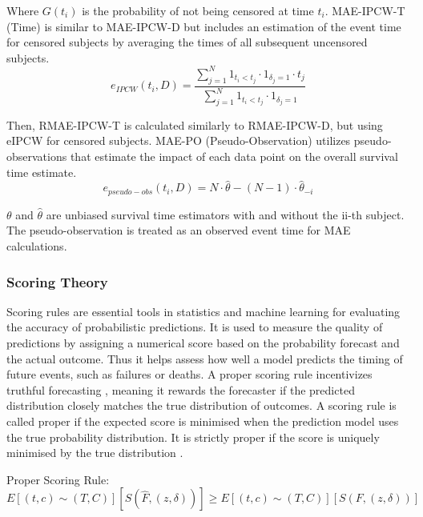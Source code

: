 \noindent Where \(G(t_{i})\) is the probability of not being censored at time \(t_{i}\). MAE-IPCW-T (Time) is similar to MAE-IPCW-D but includes an estimation of the event time for censored subjects by averaging the times of all subsequent uncensored subjects.
\begin{equation} \label{eq:maeipcw}e_{IPCW}(t_i, D) = \frac{\sum_{j=1}^N 1_{t_i<t_j} \cdot 1_{\delta_j=1} \cdot t_j}{\sum_{j=1}^N 1_{t_i<t_j} \cdot 1_{\delta_j=1}}\end{equation}
\par \noindent Then, RMAE-IPCW-T is calculated similarly to RMAE-IPCW-D, but using eIPCW  for censored subjects. MAE-PO (Pseudo-Observation) utilizes pseudo-observations that estimate the impact of each data point on the overall survival time estimate. 
\begin{equation} \label{eq:maepsuedo}e_{pseudo-obs}(t_i, D) = N \cdot \hat{\theta} - (N - 1) \cdot \hat{\theta}_{-i}\end{equation}
\par \noindent \(\theta\) and \(\hat{\theta}\) are unbiased survival time estimators with and without the ii-th subject. The pseudo-observation is treated as an observed event time for MAE calculations.

\subsubsection{Scoring Theory}
\par \noindent Scoring rules are essential tools in statistics and machine learning for evaluating the accuracy of probabilistic predictions. \parencite{yanagisawa_proper_2023} It is used to measure the quality of predictions by assigning a numerical score based on the probability forecast and the actual outcome. Thus it helps assess how well a model predicts the timing of future events, such as failures or deaths. A proper scoring rule incentivizes truthful forecasting \parencite{yanagisawa_proper_2023}, meaning it rewards the forecaster if the predicted distribution closely matches the true distribution of outcomes. A scoring rule is called proper \parencite{yanagisawa_proper_2023} if the expected score is minimised when the prediction model uses the true probability distribution. It is strictly proper if the score is uniquely minimised by the true distribution \parencite{yanagisawa_proper_2023}.

\noindent Proper Scoring Rule:
\begin{equation} \label{eq:proper}
E[(t,c) \sim (T,C)][S(\hat{F}, (z, \delta))] \geq E[(t,c) \sim (T,C)][S(F, (z, \delta))]
\end{equation}

